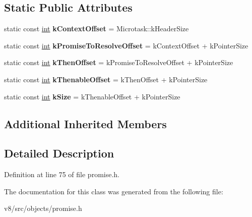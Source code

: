 \subsection*{Static Public Attributes}
\begin{DoxyCompactItemize}
\item 
\mbox{\label{classv8_1_1internal_1_1PromiseResolveThenableJobTask_a89be556e620b35125d51a8921dacefa4}} 
static const \mbox{\hyperlink{classint}{int}} {\bfseries k\+Context\+Offset} = Microtask\+::k\+Header\+Size
\item 
\mbox{\label{classv8_1_1internal_1_1PromiseResolveThenableJobTask_ad95230cf09e14423e6e9f348ae83526b}} 
static const \mbox{\hyperlink{classint}{int}} {\bfseries k\+Promise\+To\+Resolve\+Offset} = k\+Context\+Offset + k\+Pointer\+Size
\item 
\mbox{\label{classv8_1_1internal_1_1PromiseResolveThenableJobTask_ab1fa2e65b3547429b7acf36b0e80d4b8}} 
static const \mbox{\hyperlink{classint}{int}} {\bfseries k\+Then\+Offset} = k\+Promise\+To\+Resolve\+Offset + k\+Pointer\+Size
\item 
\mbox{\label{classv8_1_1internal_1_1PromiseResolveThenableJobTask_afcb68773ec605698ec59488165f46ef6}} 
static const \mbox{\hyperlink{classint}{int}} {\bfseries k\+Thenable\+Offset} = k\+Then\+Offset + k\+Pointer\+Size
\item 
\mbox{\label{classv8_1_1internal_1_1PromiseResolveThenableJobTask_a2f9bdc8f486110e0170a29e8b3adeb35}} 
static const \mbox{\hyperlink{classint}{int}} {\bfseries k\+Size} = k\+Thenable\+Offset + k\+Pointer\+Size
\end{DoxyCompactItemize}
\subsection*{Additional Inherited Members}


\subsection{Detailed Description}


Definition at line 75 of file promise.\+h.



The documentation for this class was generated from the following file\+:\begin{DoxyCompactItemize}
\item 
v8/src/objects/promise.\+h\end{DoxyCompactItemize}
